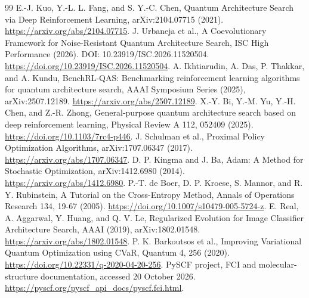 \documentclass[11pt]{article}
\begin{document}
\begin{thebibliography}{99}
 E.-J. Kuo, Y.-L. L. Fang, and S. Y.-C. Chen, Quantum Architecture Search via Deep Reinforcement Learning, arXiv:2104.07715 (2021). \url{https://arxiv.org/abs/2104.07715}.
 J. Urbaneja et al., A Coevolutionary Framework for Noise-Resistant Quantum Architecture Search, ISC High Performance (2026). DOI: 10.23919/ISC.2026.11520504. \url{https://doi.org/10.23919/ISC.2026.11520504}.
 A. Ikhtiarudin, A. Das, P. Thakkar, and A. Kundu, BenchRL-QAS: Benchmarking reinforcement learning algorithms for quantum architecture search, AAAI Symposium Series (2025), arXiv:2507.12189. \url{https://arxiv.org/abs/2507.12189}.
 X.-Y. Bi, Y.-M. Yu, Y.-H. Chen, and Z.-R. Zhong, General-purpose quantum architecture search based on deep reinforcement learning, Physical Review A 112, 052409 (2025). \url{https://doi.org/10.1103/7rc4-p446}.
 J. Schulman et al., Proximal Policy Optimization Algorithms, arXiv:1707.06347 (2017). \url{https://arxiv.org/abs/1707.06347}.
 D. P. Kingma and J. Ba, Adam: A Method for Stochastic Optimization, arXiv:1412.6980 (2014). \url{https://arxiv.org/abs/1412.6980}.
 P.-T. de Boer, D. P. Kroese, S. Mannor, and R. Y. Rubinstein, A Tutorial on the Cross-Entropy Method, Annals of Operations Research 134, 19-67 (2005). \url{https://doi.org/10.1007/s10479-005-5724-z}.
 E. Real, A. Aggarwal, Y. Huang, and Q. V. Le, Regularized Evolution for Image Classifier Architecture Search, AAAI (2019), arXiv:1802.01548. \url{https://arxiv.org/abs/1802.01548}.
 P. K. Barkoutsos et al., Improving Variational Quantum Optimization using CVaR, Quantum 4, 256 (2020). \url{https://doi.org/10.22331/q-2020-04-20-256}.
 PySCF project, FCI and molecular-structure documentation, accessed 20 October 2026. \url{https://pyscf.org/pyscf_api_docs/pyscf.fci.html}.
\end{thebibliography}
\end{document}
